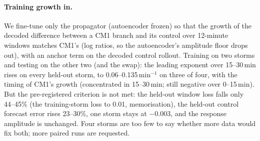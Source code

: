 \documentclass[11pt]{article}
\begin{document}
\paragraph{Training growth in.} We fine-tune only the propagator (autoencoder frozen) so that the growth of the decoded difference between a CM1 branch and its control over 12-minute windows matches CM1's (log ratios, so the autoencoder's amplitude floor drops out), with an anchor term on the decoded control rollout. Training on two storms and testing on the other two (and the swap): the leading exponent over 15--30\,min rises on every held-out storm, to 0.06--0.135\,min$^{-1}$ on three of four, with the timing of CM1's growth (concentrated in 15--30\,min; still negative over 0--15\,min). But the pre-registered criterion is not met: the held-out window loss falls only 44--45\% (the training-storm loss to 0.01, memorisation), the held-out control forecast error rises 23--30\%, one storm stays at $-0.003$, and the response amplitude is unchanged. Four storms are too few to say whether more data would fix both; more paired runs are requested.
\end{document}
